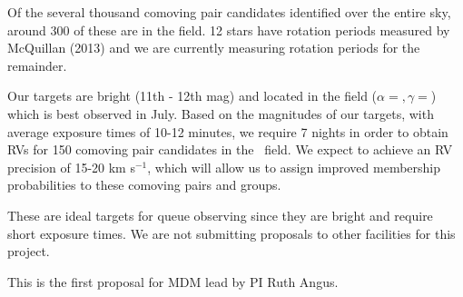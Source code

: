 Of the several thousand comoving pair candidates identified over the entire
sky, around 300 of these are in the \kepler field.
12 stars have rotation periods measured by McQuillan (2013) and we are
currently measuring rotation periods for the remainder.

%
%

\feasibility

Our targets are bright (11th - 12th mag) and located in the \kepler field
($\alpha = , \gamma = $) which is best observed in July.
Based on the magnitudes of our targets, with average exposure times of 10-12
minutes, we require 7 nights in order to obtain RVs for 150 comoving pair
candidates in the \kepler\ field.
We expect to achieve an RV precision of 15-20 km s$^{-1}$, which will allow us
to assign improved membership probabilities to these comoving pairs and
groups.

%
%

\whymdm
These are ideal targets for queue observing since they are bright and require
short exposure times.
We are not submitting proposals to other facilities for this project.

%

\thepast
This is the first proposal for MDM lead by PI Ruth Angus.


